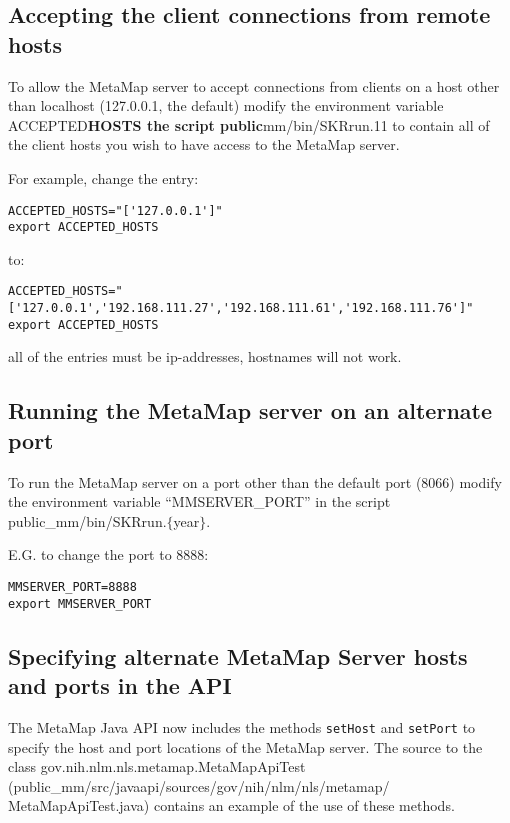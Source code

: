 \documentclass[11pt]{article}
\begin{document}
\subsection{Accepting the client connections from remote hosts}
\label{Accepting the client connections from remote hosts}

To allow the MetaMap server to accept connections from clients on a
host other than localhost (127.0.0.1, the default) modify the
environment variable ACCEPTED\textbf{HOSTS the script public}mm/bin/SKRrun.11
to contain all of the client hosts you wish to have access to the
MetaMap server.


For example, change the entry:

\begin{verbatim}
ACCEPTED_HOSTS="['127.0.0.1']"
export ACCEPTED_HOSTS
\end{verbatim}

to:

\begin{verbatim}
ACCEPTED_HOSTS="['127.0.0.1','192.168.111.27','192.168.111.61','192.168.111.76']"
export ACCEPTED_HOSTS
\end{verbatim}

all of the entries must be ip-addresses, hostnames will not work.


\subsection{Running the MetaMap server on an alternate port}
\label{Running the MetaMap server on an alternate port}

To run the MetaMap server on a port other than the default port (8066)
modify the environment variable ``MMSERVER\_PORT'' in the script
public\_mm/bin/SKRrun.\(\{\)year\(\}\).


E.G. to change the port to 8888:

\begin{verbatim}
MMSERVER_PORT=8888
export MMSERVER_PORT
\end{verbatim}

\subsection{Specifying alternate MetaMap Server hosts and ports in the API}
\label{Specifying alternate MetaMap Server hosts and ports in the API}

The MetaMap Java API now includes the methods \texttt{setHost} and \texttt{setPort}
to specify the host and port locations of the MetaMap server.  The
source to the class gov.nih.nlm.nls.metamap.MetaMapApiTest
(public\_mm/src/javaapi/sources/gov/nih/nlm/nls/metamap/
MetaMapApiTest.java) contains an example of the use of these methods.
\end{document}
